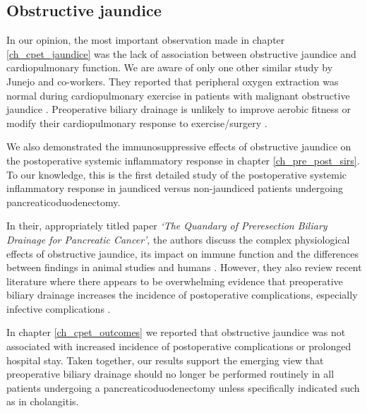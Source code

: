 \subsection{Obstructive jaundice}
In our opinion, the most important observation made in chapter \ref{ch_cpet_jaundice} was the lack of association between obstructive jaundice and cardiopulmonary function. 
We are aware of only one other similar study by Junejo and co-workers. They reported that peripheral oxygen extraction was normal during cardiopulmonary exercise in patients with malignant obstructive jaundice \parencite{junejo_peripheral_2014}.
Preoperative biliary drainage is unlikely to improve aerobic fitness or modify their cardiopulmonary response to exercise/surgery \parencite{parker_serum_2014}.

We also demonstrated the immunosuppressive effects of obstructive jaundice on the postoperative systemic inflammatory response in chapter \ref{ch_pre_post_sirs}. 
To our knowledge, this is the first detailed study of the postoperative systemic inflammatory response in jaundiced versus non-jaundiced patients undergoing pancreaticoduodenectomy.

In their, appropriately titled paper \textit{`The Quandary of Preresection Biliary Drainage for Pancreatic Cancer'}, the authors discuss the complex physiological effects of obstructive jaundice, its impact on immune function and the differences between findings in animal studies and humans \parencite{tol_quandary_2012}.
However, they also review recent literature where there appears to be overwhelming evidence that preoperative biliary drainage increases the incidence of postoperative complications, especially infective complications \parencite{van_der_gaag_preoperative_2010, arkadopoulos_preoperative_2014, fujii_preoperative_2015, furukawa_negative_2015}.

In chapter \ref{ch_cpet_outcomes} we reported that obstructive jaundice was not associated with increased incidence of postoperative complications or prolonged hospital stay. 
Taken together, our results support the emerging view that preoperative biliary drainage should no longer be performed routinely in all patients undergoing a pancreaticoduodenectomy unless specifically indicated such as in cholangitis.

